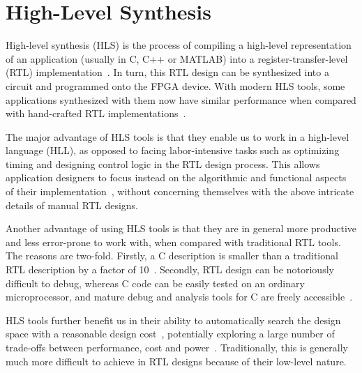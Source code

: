 \section{High-Level Synthesis}
\label{bg:sec:high_level_synthesis}

High-level synthesis (HLS) is the process of compiling a high-level
representation of an application (usually in C, C++ or MATLAB) into a
register-transfer-level (RTL) implementation~\cite{coussy, gajski}.  In
turn, this RTL design can be synthesized into a circuit and programmed onto
the FPGA device.  With modern HLS tools, some applications synthesized
with them now have similar performance when compared with hand-crafted RTL
implementations~\cite{bdti}.

The major advantage of HLS tools is that they enable us to work in a high-level
language (HLL), as opposed to facing labor-intensive tasks such as optimizing
timing and designing control logic in the RTL design process.  This allows
application designers to focus instead on the algorithmic and functional
aspects of their implementation~\cite{coussy}, without concerning themselves
with the above intricate details of manual RTL designs.

Another advantage of using HLS tools is that they are in general more
productive and less error-prone to work with, when compared with traditional
RTL tools.  The reasons are two-fold.  Firstly, a C description is smaller than
a traditional RTL description by a factor of 10~\cite{coussy, bdti}.  Secondly,
RTL design can be notoriously difficult to debug, whereas C code can be easily
tested on an ordinary microprocessor, and mature debug and analysis tools for C
are freely accessible~\cite{canis13}.

HLS tools further benefit us in their ability to automatically search
the design space with a reasonable design cost~\cite{bdti}, potentially
exploring a large number of trade-offs between performance, cost and
power~\cite{mcfarland}.  Traditionally, this is generally much more difficult
to achieve in RTL designs because of their low-level nature.



